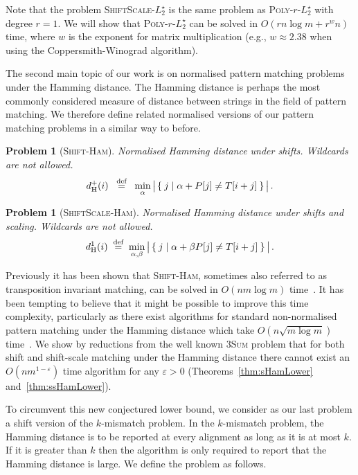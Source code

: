 \documentclass[11pt]{article}
\renewcommand{\epsilon}{\varepsilon}
\newcommand{\wildcard}{\ensuremath{\star}\xspace}
\newcommand{\ssLtwoWild}{\textsc{ShiftScale-$L_2^\wildcard$}\xspace}
\newcommand{\LpolyWild}{\textsc{Poly-$r$-$L_2^\wildcard$}\xspace}
\newcommand{\sHam}{\textsc{Shift-Ham}\xspace}
\newcommand{\DsHam}{\ensuremath{d_\textup{H}^+}}
\newcommand{\ssHam}{\textsc{ShiftScale-Ham}\xspace}
\newcommand{\DssHam}{\ensuremath{d_\textup{H}^1}}
\newcommand{\threeSUM}{\textsc{3Sum}\xspace}
\theoremstyle{plain}
\newtheorem{problem}[theorem]{Problem}
\theoremstyle{definition}
\begin{document}
Note that the problem \ssLtwoWild is the same problem as \LpolyWild with degree $r=1$. We will show that \LpolyWild can be solved in $O(r n\log{m} + r^{w} n)$ time, where $w$ is the exponent for matrix multiplication (e.g., $w\approx 2.38$ when using the Coppersmith-Winograd algorithm).

The second main topic of our work is on normalised pattern matching problems under the Hamming distance. The Hamming distance is perhaps the most commonly considered measure of distance between strings in the field of pattern matching. We therefore define related normalised versions of our pattern matching problems in a similar way to before.

\begin{problem}[\sHam]
    \label{prob:sHam}
    Normalised Hamming distance under shifts. Wildcards are not allowed.
\begin{equation*}
        \DsHam(i) \;\eqdef\; \min_{\alpha} \big| \Set{j | \alpha + P[j] \neq T[i+j]} \big| \,.
\end{equation*}
\end{problem}

\begin{problem}[\ssHam]
    \label{prob:ssHam}
    Normalised Hamming distance under shifts and scaling. Wildcards are not allowed.
\begin{equation*}
        \DssHam(i) \eqdef \min_{\alpha,\beta} \big| \Set{j | \alpha + \beta P[j] \neq T[i+j]} \big| \,.
\end{equation*}
\end{problem}



Previously it has been shown that \sHam, sometimes also referred to as transposition invariant matching, can be solved in $O(nm\log{m})$ time~\cite{MNU:2005}.  It has been tempting to believe that it might be possible to improve this time complexity, particularly as there exist algorithms for standard non-normalised pattern matching under the Hamming distance which take $O(n\sqrt{m \log{m}})$ time~\cite{Abrahamson:1987,Kosaraju:1987}.
We show by reductions from the well known \threeSUM problem that for both shift and shift-scale matching under the Hamming distance there cannot exist an $O(nm^{1-\epsilon})$ time algorithm for any $\epsilon>0$ (Theorems~\ref{thm:sHamLower} and~\ref{thm:ssHamLower}).

To circumvent this new conjectured lower bound, we consider as our last problem a shift version of the $k$-mismatch problem. In the $k$-mismatch problem, the Hamming distance is to be reported at every alignment as long as it is at most $k$.  If it is greater than $k$ then the algorithm is only required to report that the Hamming distance is large.  We define the problem as follows.
\end{document}
